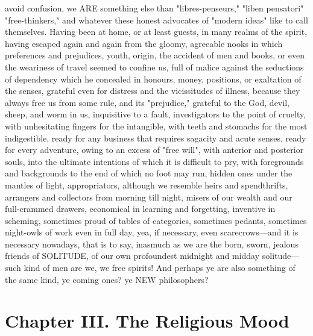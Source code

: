 \documentclass[12pt]{article}
\begin{document}
avoid confusion, we ARE something else than "libres-penseurs," "liben pensatori" "free-thinkers," and whatever these honest advocates of "modern ideas" like to call themselves. Having been at home, or at least guests, in many realms of the spirit, having escaped again and again from the gloomy, agreeable nooks in which preferences and prejudices, youth, origin, the accident of men and books, or even the weariness of travel seemed to confine us, full of malice against the seductions of dependency which he concealed in honours, money, positions, or exaltation of the senses, grateful even for distress and the vicissitudes of illness, because they always free us from some rule, and its "prejudice," grateful to the God, devil, sheep, and worm in us, inquisitive to a fault, investigators to the point of cruelty, with unhesitating fingers for the intangible, with teeth and stomachs for the most indigestible, ready for any business that requires sagacity and acute senses, ready for every adventure, owing to an excess of "free will", with anterior and posterior souls, into the ultimate intentions of which it is difficult to pry, with foregrounds and backgrounds to the end of which no foot may run, hidden ones under the mantles of light, appropriators, although we resemble heirs and spendthrifts, arrangers and collectors from morning till night, misers of our wealth and our full-crammed drawers, economical in learning and forgetting, inventive in scheming, sometimes proud of tables of categories, sometimes pedants, sometimes night-owls of work even in full day, yea, if necessary, even scarecrows---and it is necessary nowadays, that is to say, inasmuch as we are the born, sworn, jealous friends of SOLITUDE, of our own profoundest midnight and midday solitude---such kind of men are we, we free spirits! And perhaps ye are also something of the same kind, ye coming ones? ye NEW philosophers?

\section*{Chapter III. The Religious Mood}
\end{document}
